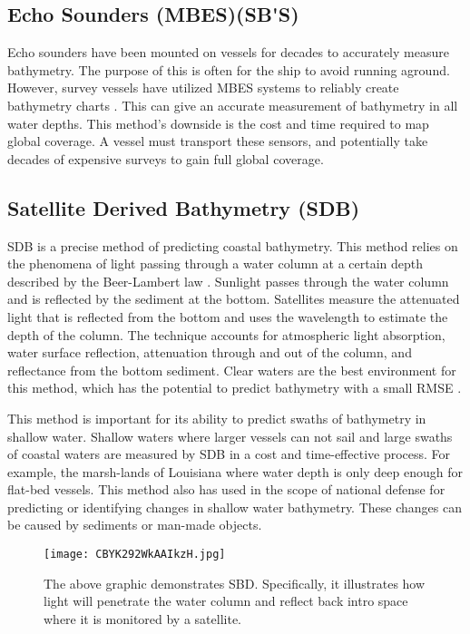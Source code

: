 \subsection{Echo Sounders (\ac{MBES})(\ac{SB'S}) }
Echo sounders have been mounted on vessels for decades to accurately measure bathymetry.
The purpose of this is often for the ship to avoid running aground.
However, survey vessels have utilized \ac{MBES} systems to reliably create bathymetry charts \cite{farr1980multibeam}.
This can give an accurate measurement of bathymetry in all water depths.
This method's downside is the cost and time required to map global coverage.
A vessel must transport these sensors, and potentially take decades of expensive surveys to gain full global coverage.

\subsection{Satellite Derived Bathymetry (SDB)}
\ac{SDB} is a precise method of predicting coastal bathymetry. 
This method relies on the phenomena of light passing through a water column at a certain depth described by the Beer-Lambert law \cite{chybicki2018three}\cite{vinayaraj2016satellite}.
Sunlight passes through the water column and is reflected by the sediment at the bottom.
Satellites measure the attenuated light that is reflected from the bottom and uses the wavelength to estimate the depth of the column.
The technique accounts for atmospheric light absorption, water surface reflection, attenuation through and out of the column, and reflectance from the bottom sediment.
Clear waters are the best environment for this method, which has the potential to predict bathymetry with a small RMSE \cite{chybicki2018three}.

\par
This method is important for its ability to predict swaths of bathymetry in shallow water.
Shallow waters where larger vessels can not sail and large swaths of coastal waters are measured by \ac{SDB} in a cost and time-effective process.
For example, the marsh-lands of Louisiana where water depth is only deep enough for flat-bed vessels.
This method also has used in the scope of national defense for predicting or identifying changes in shallow water bathymetry.
These changes can be caused by sediments or man-made objects. 

\begin{figure}[h]
    \centering
    \texttt{[image: CBYK292WkAAIkzH.jpg]}
    \caption{The above graphic demonstrates \ac{SBD}.
    Specifically, it illustrates how light will penetrate the water column and reflect back intro space where it is monitored by a satellite.}
    \label{fig:sdb}
\end{figure}

